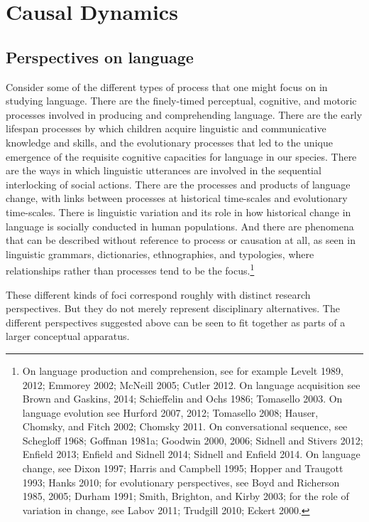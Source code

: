 \chapter{Causal Dynamics }





\section{Perspectives on language}


Consider some of the different types of process that one might focus on in studying language. There are the finely-timed perceptual, cognitive, and motoric processes involved in producing and comprehending language. There are the early lifespan processes by which children acquire linguistic and communicative knowledge and skills, and the evolutionary processes that led to the unique emergence of the requisite cognitive capacities for language in our species. There are the ways in which linguistic utterances are involved in the sequential interlocking of social actions. There are the processes and products of language change, with links between processes at historical time-scales and evolutionary time-scales. There is linguistic variation and its role in how historical change in language is socially conducted in human populations. And there are phenomena that can be described without reference to process or causation at all, as seen in linguistic grammars, dictionaries, ethnographies, and typologies, where relationships rather than processes tend to be the focus.\footnote{On language production and comprehension, see for example Levelt 1989, 2012; Emmorey 2002; McNeill 2005; Cutler 2012. On language acquisition see Brown and  Gaskins, 2014; Schieffelin and Ochs 1986; Tomasello 2003. On language evolution see Hurford 2007, 2012;  Tomasello 2008; Hauser, Chomsky, and Fitch 2002; Chomsky 2011. On conversational sequence, see Schegloff 1968; Goffman  1981a; Goodwin 2000, 2006; Sidnell and Stivers 2012; Enfield 2013;  Enfield and Sidnell 2014; Sidnell and Enfield 2014. On language change, see Dixon  1997; Harris and Campbell 1995; Hopper and Traugott 1993; Hanks 2010; for evolutionary perspectives, see Boyd and Richerson 1985, 2005; Durham 1991; Smith, Brighton, and Kirby 2003; for the role of variation in change, see Labov 2011;  Trudgill 2010; Eckert 2000.}

These different kinds of foci correspond roughly with distinct research 
perspectives. But they do not merely represent disciplinary 
alternatives. The different perspectives suggested above can be seen to 
fit together as parts of a larger conceptual apparatus. 



